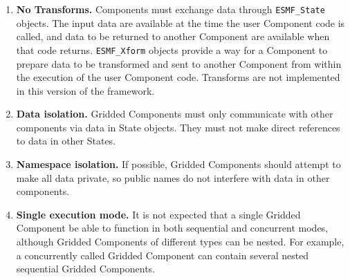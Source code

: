 %


\begin{enumerate}

\item {\bf No Transforms.}  Components must exchange data through   
{\tt ESMF\_State} objects.  The input data are available at the time 
the user Component code is called, and data to be returned to another 
Component are available when that code returns.  
{\tt ESMF\_Xform} objects provide a way for
a Component to prepare data to be transformed and 
sent to another Component from within the execution of 
the user Component code.
Transforms are not implemented in this version of the framework.

\item {\bf Data isolation.} 
Gridded Components must only communicate with other
components via data in State objects.  They must 
not make direct references to data in other States.

\item {\bf Namespace isolation.}
If possible, Gridded Components should attempt to make 
all data private, so public names do not interfere with data 
in other components.

\item {\bf Single execution mode.}
It is not expected that a single Gridded Component be able 
to function in both sequential and concurrent modes, although 
Gridded Components of different types can be nested. For example,
a concurrently called Gridded Component can contain several nested 
sequential Gridded Components. 

\end{enumerate}

